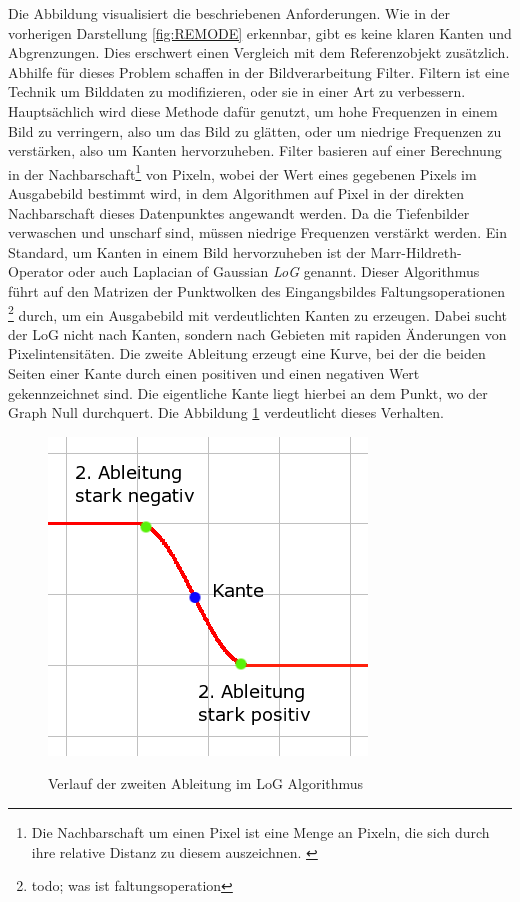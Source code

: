 Die Abbildung visualisiert die beschriebenen Anforderungen. \newline
Wie in der vorherigen Darstellung \ref{fig:REMODE} erkennbar, gibt es keine klaren Kanten und Abgrenzungen. Dies erschwert einen Vergleich mit dem Referenzobjekt zusätzlich. Abhilfe für dieses Problem schaffen in der Bildverarbeitung Filter. Filtern ist eine Technik um Bilddaten zu modifizieren, oder sie in einer Art zu verbessern. Hauptsächlich wird diese Methode dafür genutzt, um hohe Frequenzen in einem Bild zu verringern, also um das Bild zu glätten, oder um niedrige Frequenzen zu verstärken, also um Kanten hervorzuheben. \newline
Filter basieren auf einer Berechnung in der Nachbarschaft\footnote{Die Nachbarschaft um einen Pixel ist eine Menge an Pixeln, die sich durch ihre relative Distanz zu diesem auszeichnen. \cite{filter1}} von Pixeln, wobei der Wert eines gegebenen Pixels im Ausgabebild bestimmt wird, in dem Algorithmen auf Pixel in der direkten Nachbarschaft dieses Datenpunktes angewandt werden. \cite{filter1}   \newline
Da die Tiefenbilder verwaschen und unscharf sind, müssen niedrige Frequenzen verstärkt werden. Ein Standard, um Kanten in einem Bild hervorzuheben ist der Marr-Hildreth-Operator oder auch Laplacian of Gaussian \textit{LoG} genannt. \cite{LoG} Dieser Algorithmus führt auf den Matrizen der Punktwolken des Eingangsbildes Faltungsoperationen \footnote{todo; was ist faltungsoperation} durch, um ein Ausgabebild mit verdeutlichten Kanten zu erzeugen. \newline
Dabei sucht der LoG nicht nach Kanten, sondern nach Gebieten mit rapiden Änderungen von Pixelintensitäten. Die zweite Ableitung erzeugt eine Kurve, bei der die beiden Seiten einer Kante durch einen positiven und einen negativen Wert gekennzeichnet sind. Die eigentliche Kante liegt hierbei an dem Punkt, wo der Graph Null durchquert. Die Abbildung \ref{fig:LoG} verdeutlicht dieses Verhalten.
\begin{figure}[ht]
	\centering
	\includegraphics[scale=0.5]{Bilder/LoG.png}
	\label{fig:LoG}
	\caption{Verlauf der zweiten Ableitung im LoG Algorithmus \cite{LoG}}
\end{figure}

